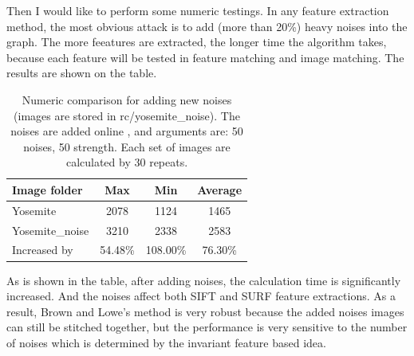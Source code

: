 \documentclass[10pt,twocolumn,letterpaper]{article}
\begin{document}
Then I would like to perform some numeric testings.
In any feature extraction method, the most obvious attack is to add (more than 20\%) heavy noises into the graph.
The more feeatures are extracted, the longer time the algorithm takes, because each feature will be tested in feature matching and image matching.
The results are shown on the table.

\begin{table}
\begin{center}
\begin{tabular}{|l|c|c|c|}
\hline
Image folder & Max & Min & Average \\
\hline\hline
Yosemite & 2078 & 1124 & 1465 \\
Yosemite\_noise & 3210 & 2338 & 2583 \\
Increased by & 54.48\% & 108.00\% & 76.30\% \\
\hline
\end{tabular}
\end{center}
\caption{Numeric comparison for adding new noises (images are stored in rc/yosemite\_noise). The noises are added online \cite{noise}, and arguments are: 50 noises, 50 strength. Each set of images are calculated by 30 repeats.}
\end{table}

As is shown in the table, after adding noises, the calculation time is significantly increased.
And the noises affect both SIFT and SURF feature extractions.
As a result, Brown and Lowe's method is very robust because the added noises images can still be stitched together,
but the performance is very sensitive to the number of noises which is determined by the invariant feature based idea.
\end{document}
